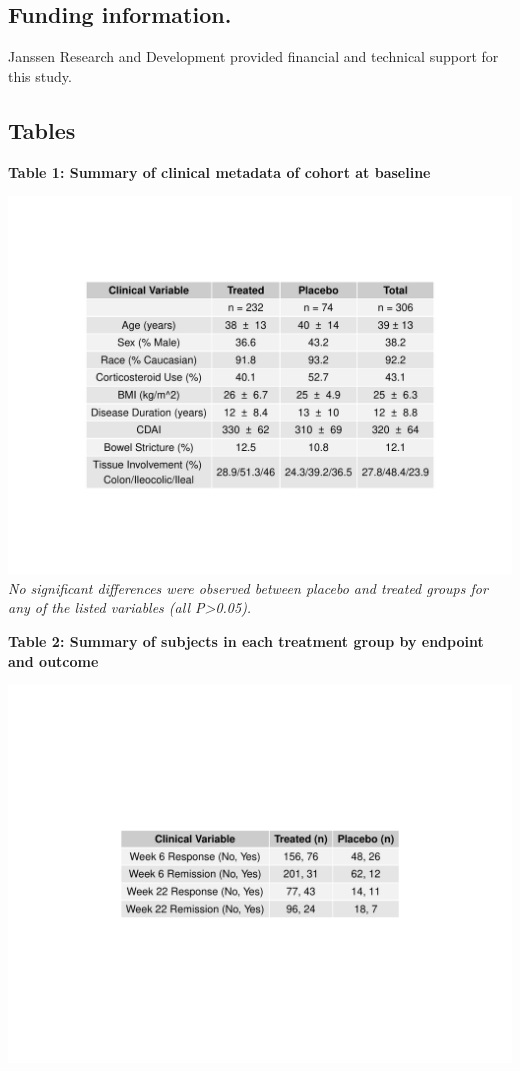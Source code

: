 \documentclass[12pt,]{article}
\begin{document}
\subsection{Funding information.}\label{funding-information.}

Janssen Research and Development provided financial and technical
support for this study.

\newpage

\subsection{Tables}\label{tables}

\textbf{Table 1: Summary of clinical metadata of cohort at baseline}

\includegraphics{tables/Table1_baseline_metadata.pdf}
\textit{No significant differences were observed between placebo and treated groups for any of the listed variables (all P>0.05).}

\newpage

\textbf{Table 2: Summary of subjects in each treatment group by endpoint
and outcome}

\includegraphics{tables/table2_resposne_treatN.pdf}
\end{document}
